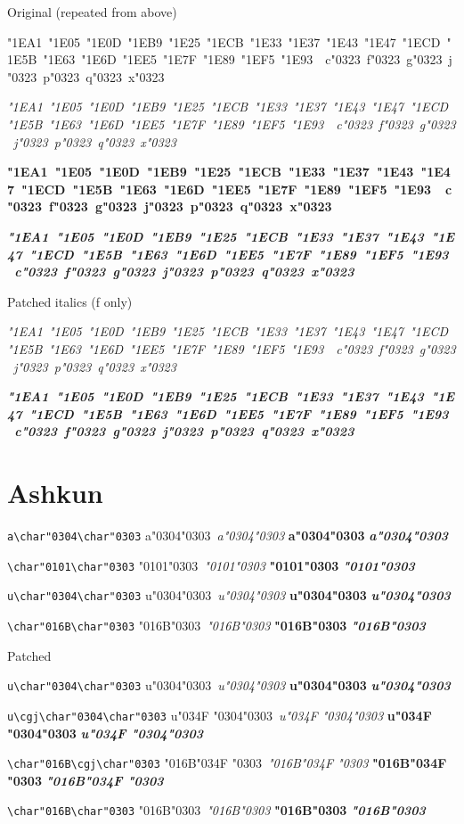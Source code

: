 \documentclass[landscape]{article}
\newcommand{\ribbi}[1]{#1\
	
	{\itshape #1}
	
	{\bfseries #1}
	
	{\itshape\bfseries #1}}
\newcommand{\ribbiline}[1]{#1\ 
	{\itshape #1}
	{\bfseries #1}
	{\itshape\bfseries #1}}
\newcommand{\cgj}{\char"034F }
\begin{document}
Original (repeated from above)

\ribbi{
	\char"1EA1\ \char"1E05\ \char"1E0D\ \char"1EB9\ \char"1E25\ \char"1ECB\ \char"1E33\ \char"1E37\ \char"1E43\ \char"1E47\ \char"1ECD\ \char"1E5B\ \char"1E63\ \char"1E6D\ \char"1EE5\ \char"1E7F\ \char"1E89\ \char"1EF5\ \char"1E93\
	\ c\char"0323\ f\char"0323\ g\char"0323\ j\char"0323\ p\char"0323\ q\char"0323\ 
	x\char"0323}

Patched italics (f only)

{\LibertinusSerifPatch \itshape
	\char"1EA1\ \char"1E05\ \char"1E0D\ \char"1EB9\ \char"1E25\ \char"1ECB\ \char"1E33\ \char"1E37\ \char"1E43\ \char"1E47\ \char"1ECD\ \char"1E5B\ \char"1E63\ \char"1E6D\ \char"1EE5\ \char"1E7F\ \char"1E89\ \char"1EF5\ \char"1E93\
	\ c\char"0323\ f\char"0323\ g\char"0323\ j\char"0323\ p\char"0323\ q\char"0323\ 
	x\char"0323}

{\LibertinusSerifPatch \itshape \bfseries
	\char"1EA1\ \char"1E05\ \char"1E0D\ \char"1EB9\ \char"1E25\ \char"1ECB\ \char"1E33\ \char"1E37\ \char"1E43\ \char"1E47\ \char"1ECD\ \char"1E5B\ \char"1E63\ \char"1E6D\ \char"1EE5\ \char"1E7F\ \char"1E89\ \char"1EF5\ \char"1E93\
	\ c\char"0323\ f\char"0323\ g\char"0323\ j\char"0323\ p\char"0323\ q\char"0323\ 
	x\char"0323}

\section*{Ashkun}

\verb|a\char"0304\char"0303| \ribbiline{a\char"0304\char"0303}


\verb|\char"0101\char"0303| \ribbiline{\char"0101\char"0303}


\verb|u\char"0304\char"0303| \ribbiline{u\char"0304\char"0303}


\verb|\char"016B\char"0303| \ribbiline{\char"016B\char"0303}


Patched

{\LibertinusSerifPatch
\verb|u\char"0304\char"0303| \ribbiline{u\char"0304\char"0303}

\verb|u\cgj\char"0304\char"0303| \ribbiline{u\cgj\char"0304\char"0303}

\verb|\char"016B\cgj\char"0303| \ribbiline{\char"016B\cgj\char"0303}

\verb|\char"016B\char"0303| \ribbiline{\char"016B\char"0303}

}
\end{document}
